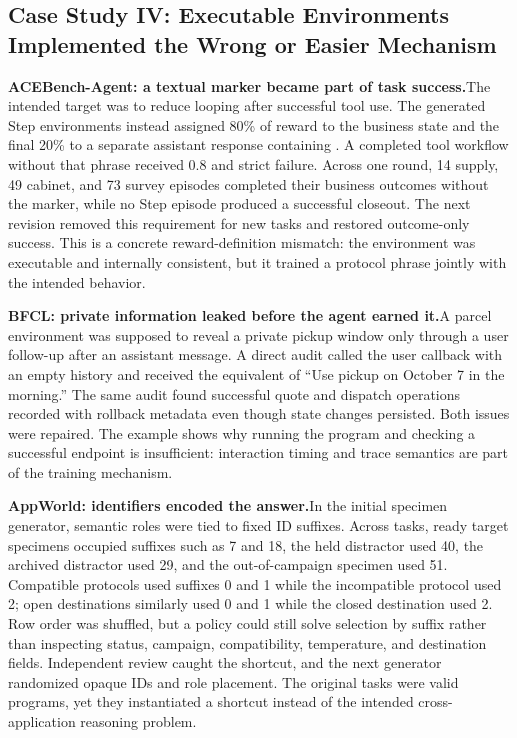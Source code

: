 \FloatBarrier

\subsection{Case Study IV: Executable Environments Implemented the Wrong or Easier Mechanism}

\textbf{ACEBench-Agent: a textual marker became part of task success.}\quad The intended target was to reduce looping after successful tool use. The generated Step environments instead assigned 80\% of reward to the business state and the final 20\% to a separate assistant response containing . A completed tool workflow without that phrase received 0.8 and strict failure. Across one round, 14 supply, 49 cabinet, and 73 survey episodes completed their business outcomes without the marker, while no Step episode produced a successful closeout. The next revision removed this requirement for new tasks and restored outcome-only success. This is a concrete reward-definition mismatch: the environment was executable and internally consistent, but it trained a protocol phrase jointly with the intended behavior.

\textbf{BFCL: private information leaked before the agent earned it.}\quad A parcel environment was supposed to reveal a private pickup window only through a user follow-up after an assistant message. A direct audit called the user callback with an empty history and received the equivalent of ``Use pickup on October 7 in the morning.'' The same audit found successful quote and dispatch operations recorded with rollback metadata even though state changes persisted. Both issues were repaired. The example shows why running the program and checking a successful endpoint is insufficient: interaction timing and trace semantics are part of the training mechanism.

\textbf{AppWorld: identifiers encoded the answer.}\quad In the initial specimen generator, semantic roles were tied to fixed ID suffixes. Across tasks, ready target specimens occupied suffixes such as 7 and 18, the held distractor used 40, the archived distractor used 29, and the out-of-campaign specimen used 51. Compatible protocols used suffixes 0 and 1 while the incompatible protocol used 2; open destinations similarly used 0 and 1 while the closed destination used 2. Row order was shuffled, but a policy could still solve selection by suffix rather than inspecting status, campaign, compatibility, temperature, and destination fields. Independent review caught the shortcut, and the next generator randomized opaque IDs and role placement. The original tasks were valid programs, yet they instantiated a shortcut instead of the intended cross-application reasoning problem.

